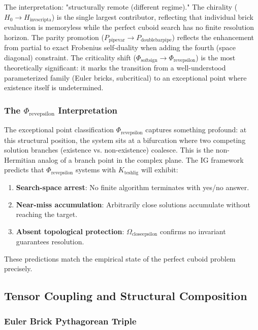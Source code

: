 \documentclass[10pt,a4paper]{article}
\begin{document}
The interpretation: "structurally remote (different regime)." The chirality ($H_0 \to H_{\text{invscripta}}$) is the single largest contributor, reflecting that individual brick evaluation is memoryless while the perfect cuboid search has no finite resolution horizon. The parity promotion ($P_{\text{pipevar}} \to P_{\text{doublebarpipe}}$) reflects the enhancement from partial to exact Frobenius self-duality when adding the fourth (space diagonal) constraint. The criticality shift ($\Phi_{\text{softsign}} \to \Phi_{\text{revepsilon}}$) is the most theoretically significant: it marks the transition from a well-understood parameterized family (Euler bricks, subcritical) to an exceptional point where existence itself is undetermined.

\subsubsection{The $\Phi_{\text{revepsilon}}$ Interpretation}

The exceptional point classification $\Phi_{\text{revepsilon}}$ captures something profound: at this structural position, the system sits at a bifurcation where two competing solution branches (existence vs. non-existence) coalesce. This is the non-Hermitian analog of a branch point in the complex plane. The IG framework predicts that $\Phi_{\text{revepsilon}}$ systems with $K_{\text{teshlig}}$ will exhibit:

\begin{enumerate}
    \item \textbf{Search-space arrest}: No finite algorithm terminates with yes/no answer.
    \item \textbf{Near-miss accumulation}: Arbitrarily close solutions accumulate without reaching the target.
    \item \textbf{Absent topological protection}: $\Omega_{\text{closeepsilon}}$ confirms no invariant guarantees resolution.
\end{enumerate}

These predictions match the empirical state of the perfect cuboid problem precisely.

\subsection{Tensor Coupling and Structural Composition}

\subsubsection{Euler Brick \otimes Pythagorean Triple}
\end{document}
